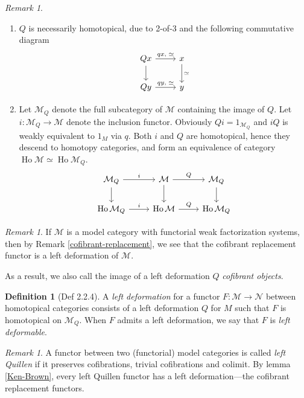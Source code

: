 \documentclass[11pt]{article}
\theoremstyle{definition}
\newtheorem{definition}[theorem]{Definition}
\theoremstyle{remark}
\newtheorem{remark}[theorem]{Remark}
\newcommand{\Ho}{\operatorname{Ho}}
\newcommand{\calM}{\mathcal{M}}
\newcommand{\calN}{\mathcal{N}}
\begin{document}
\begin{remark}
    \begin{enumerate}
        \item $Q$ is necessarily homotopical, due to 2-of-3 and the following commutative diagram
            \[
            \begin{tikzcd}
                Qx \arrow[r, "qx\text{, }\simeq"] \arrow[d] & x \arrow[d, "\simeq"] \\
                Qy \arrow[r, "qy\text{, }\simeq"] & y
            \end{tikzcd}
            \]
        \item Let $\calM_Q$ denote the full subcategory of $\calM$ containing the image of $Q$.
            Let $i : \calM_Q \to \calM$ denote the inclusion functor.
            Obviously $Qi = 1_{\calM_Q}$ and $iQ$ is weakly equivalent to $1_M$ via $q$.
            Both $i$ and $Q$ are homotopical, hence they descend to homotopy categories,
            and form an equivalence of category $\Ho\calM \simeq \Ho\calM_Q$.
            \[
            \begin{tikzcd}
                \calM_Q \arrow[r, "i"] \arrow[d] & \calM \arrow[r, "Q"] \arrow[d] & \calM_Q \arrow[d] \\
                \Ho\calM_Q \arrow[r, "i"] & \Ho\calM \arrow[r, "Q"] & \Ho\calM_Q
            \end{tikzcd}
            \]
    \end{enumerate}
\end{remark}

\begin{remark}
    If $\calM$ is a model category with functorial weak factorization systems,
    then by Remark \ref{cofibrant-replacement}, we see that the cofibrant replacement
    functor is a left deformation of $\calM$.

    As a result, we also call the image of a left deformation $Q$ \emph{cofibrant objects}.
\end{remark}

\begin{definition}[Def 2.2.4]
    A \emph{left deformation} for a functor $F : \calM \to \calN$ between homotopical
    categories consists of a left deformation $Q$ for $M$ such that $F$ is homotopical on $\calM_Q$.
    When $F$ admits a left deformation, we say that $F$ is \emph{left deformable}.
\end{definition}

\begin{remark}
    A functor between two (functorial) model categories
    is called \emph{left Quillen} if it preserves cofibrations, trivial cofibrations and colimit.
    By lemma \ref{Ken-Brown}, every left Quillen functor has a left deformation---the cofibrant replacement functors.
\end{remark}
\end{document}
